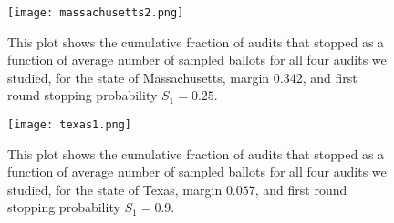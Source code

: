 \begin{figure}
\begin{centering}
\texttt{[image: massachusetts2.png]}
\caption{This plot shows the cumulative fraction of audits that stopped as a function of average number of sampled ballots for all four audits we studied, for the state of Massachusetts, margin $0.342$, and first round stopping probability $S_1=0.25$.}
\label{fig:mass_25}
\end{centering}
\end{figure}

\begin{figure}
\begin{centering}
\texttt{[image: texas1.png]}
\caption{This plot shows the cumulative fraction of audits that stopped as a function of average number of sampled ballots for all four audits we studied, for the state of Texas, margin $0.057$, and first round stopping probability $S_1=0.9$.}
\label{fig:texas_90}
\end{centering}
\end{figure}

